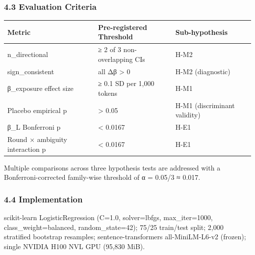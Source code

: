 \subsubsection{4.3 Evaluation Criteria}

\begin{table}[htbp]
\centering
\begin{tabular}{lll}
\toprule
Metric & Pre-registered Threshold & Sub-hypothesis \\
\midrule
n_directional & ≥ 2 of 3 non-overlapping CIs & H-M2 \\
sign_consistent & all Δβ > 0 & H-M2 (diagnostic) \\
β_exposure effect size & ≥ 0.1 SD per 1,000 tokens & H-M1 \\
Placebo empirical p & > 0.05 & H-M1 (discriminant validity) \\
β_L Bonferroni p & < 0.0167 & H-E1 \\
Round × ambiguity interaction p & < 0.0167 & H-E1 \\
\bottomrule
\end{tabular}
\end{table}

Multiple comparisons across three hypothesis tests are addressed with a Bonferroni-corrected family-wise threshold of α = 0.05/3 ≈ 0.017.

\subsubsection{4.4 Implementation}

scikit-learn LogisticRegression (C=1.0, solver=lbfgs, max_iter=1000, class_weight=balanced, random_state=42); 75/25 train/test split; 2,000 stratified bootstrap resamples; sentence-transformers all-MiniLM-L6-v2 (frozen); single NVIDIA H100 NVL GPU (95,830 MiB).

